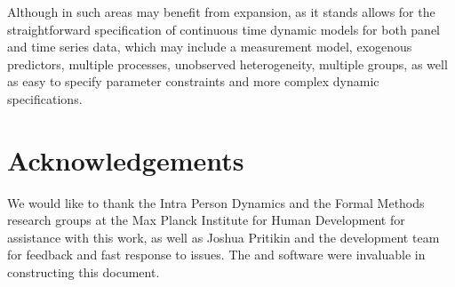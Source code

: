 \documentclass[nojss]{jss}\usepackage[]{graphicx}\usepackage[]{color}
\begin{document}
Although in such areas  may benefit from expansion,  as it stands allows for the straightforward specification of continuous time dynamic models for both panel and time series data, which may include a measurement model, exogenous predictors, multiple processes, unobserved heterogeneity, multiple groups, as well as easy to specify parameter constraints and more complex dynamic specifications. 

\section[Acknowledgements]{Acknowledgements}\nopagebreak
We would like to thank the Intra Person Dynamics and the Formal Methods research groups at the Max Planck Institute for Human Development for assistance with this work, as well as Joshua Pritikin and the  development team for feedback and fast response to issues. The  \citep{xie2015Dynamic} and  \citep{vonoertzen2015structural} software were invaluable in constructing this document.


\newpage
\appendix
\end{document}
